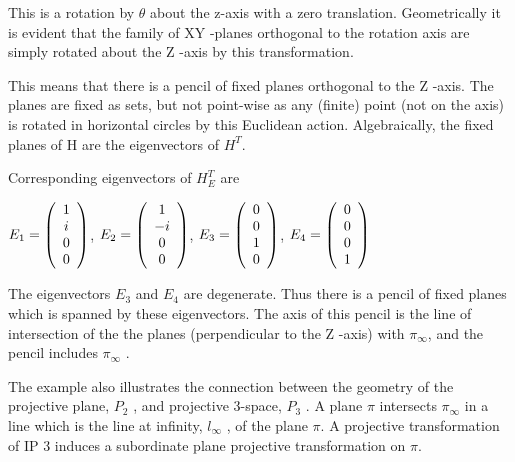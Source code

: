 \documentclass[]{article}
\begin{document}
This is a rotation by $ \theta $ about the z-axis with a zero translation. Geometrically it is evident that the family of XY -planes orthogonal to the rotation axis are simply rotated about the Z -axis by this transformation.

This means that there is a pencil of fixed planes orthogonal to the Z -axis. The planes
are fixed as sets, but not point-wise as any (finite) point (not on the axis) is rotated in horizontal circles by this Euclidean action. Algebraically, the fixed planes of H are the eigenvectors of $H^T$.

Corresponding eigenvectors of $H_E^T$ are 

\centerline {
	$E_1 = \left( {\begin{array}{*{20}c}
		1 \\
		i \\ 
		0 \\
		0   
		\end{array} } \right)$, $E_2 = \left( {\begin{array}{*{20}c}
		1 \\
		-i \\ 
		0 \\
		0   
		\end{array} } \right)$, 	$E_3 = \left( {\begin{array}{*{20}c}
		0 \\
		0 \\ 
		1 \\
		0   
		\end{array} } \right)$, 	$E_4 = \left( {\begin{array}{*{20}c}
		0 \\
		0 \\ 
		0 \\
		1   
		\end{array} } \right)$
}

The eigenvectors $E_3$ and $E_4$ are degenerate. Thus there is a pencil of fixed planes which is spanned by these eigenvectors. The axis of this pencil is the line of intersection of the the planes (perpendicular to the Z -axis) with $\pi _ \infty$, and the pencil includes $\pi _ \infty$ .

The example also illustrates the connection between the geometry of the projective
plane, $P_2$ , and projective 3-space, $P_3$ . A plane $\pi$ intersects $\pi _ \infty$ in a line which is the line at infinity,  $l_ \infty$ , of the plane $\pi$. A projective transformation of IP 3 induces a subordinate plane projective transformation on $\pi$.
\end{document}
